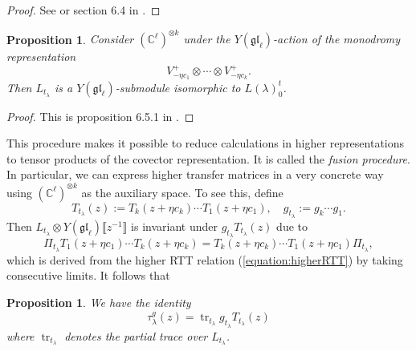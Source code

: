 \documentclass[11pt]{report}
\newtheorem{prop}[theorem]{Proposition}
\theoremstyle{definition}
\theoremstyle{remark}
\theoremstyle{remark}
\newcommand{\C}{\mathbb{C}}
\begin{document}
\begin{proof}
See \cite{article:molev:2008} or section 6.4 in \cite{book:molev}.
\end{proof}

\begin{prop}\label{prop:fusionReps}
Consider $(\C^\ell)^{\otimes k}$ under the $Y(\mathfrak{gl}_\ell)$-action of the monodromy representation
\begin{equation*}
V_{-\eta c_1}^+ \otimes \cdots \otimes V_{-\eta c_k}^+.
\end{equation*}
Then $L_{t_\lambda}$ is a $Y(\mathfrak{gl}_\ell)$-submodule isomorphic to $L(\lambda)_0^t$.
\end{prop}

\begin{proof}
This is proposition 6.5.1 in \cite{book:molev}.
\end{proof}

This procedure makes it possible to reduce calculations in higher representations to tensor products of the covector representation. It is called the \emph{fusion procedure}. In particular, we can express higher transfer matrices in a very concrete way using $(\C^\ell)^{\otimes k}$ as the auxiliary space. To see this, define
\begin{equation*}
T_{t_\lambda}(z) := T_k(z+\eta c_k) \cdots T_1(z+\eta c_1), \quad g_{t_\lambda} := g_k \cdots g_1.
\end{equation*}
Then $L_{t_\lambda} \otimes Y(\mathfrak{gl}_\ell)\llbracket z^{-1} \rrbracket$ is invariant under $g_{t_\lambda} T_{t_\lambda}(z)$ due to
\begin{equation*}
\Pi_{t_\lambda} T_1(z+\eta c_1) \cdots T_k(z+\eta c_k) = T_k(z+\eta c_k) \cdots T_1(z+\eta c_1) \Pi_{t_\lambda},
\end{equation*}
which is derived from the higher RTT relation (\ref{equation:higherRTT}) by taking consecutive limits. It follows that

\begin{prop}
We have the identity
\begin{equation*}
\tau_\lambda^g(z) = \operatorname{tr}_{t_\lambda} g_{t_\lambda} T_{t_\lambda}(z)
\end{equation*}
where $\operatorname{tr}_{t_\lambda}$ denotes the partial trace over $L_{t_\lambda}$.
\end{prop}
\end{document}
